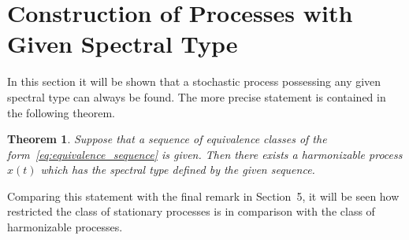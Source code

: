 \documentclass[11pt]{article}
\newtheorem{theorem}{Theorem}
\begin{document}
\section{Construction of Processes with Given Spectral Type}

In this section it will be shown that a stochastic process possessing any given spectral type can always be found. The more precise statement is contained in the following theorem.

\begin{theorem}\label{thm:construction}
Suppose that a sequence of equivalence classes of the form~\eqref{eq:equivalence_sequence} is given. Then there exists a harmonizable process $x(t)$ which has the spectral type defined by the given sequence.
\end{theorem}

Comparing this statement with the final remark in Section~5, it will be seen how restricted the class of stationary processes is in comparison with the class of harmonizable processes.
\end{document}
